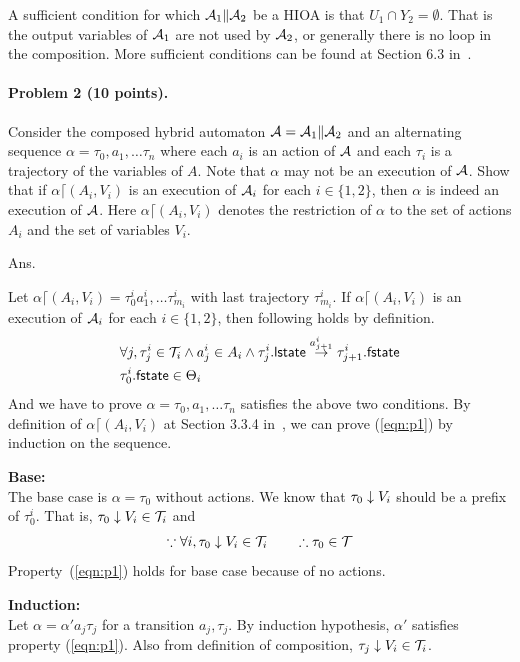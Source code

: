 \documentclass[11pt]{article}
\begin{document}
A sufficient condition for which ${\cal A}_1 \| {\cal A}_2$ be a HIOA is that  $U_1 \cap Y_2 = \emptyset$.
That is the output variables of ${\cal A}_1$ are not used by ${\cal A}_2$,
or generally there is no loop in the composition.
More sufficient conditions can be found at Section 6.3 in~\cite{Lynch2003105}.

\newpage

\paragraph{Problem 2 (10 points).}
Consider the composed hybrid automaton ${\cal A} = {\cal A}_1 \| {\cal A}_2$ and 
an alternating sequence $\alpha = \tau_0, a_1, \ldots \tau_n$ where each $a_i$ is an action of ${\cal A}$ and each $\tau_i$ is a trajectory of the variables of $A$. 
Note that $\alpha$ may not be an execution of ${\cal A}$. 
Show that if $\alpha \lceil (A_i, V_i)$ is an execution of ${\cal A}_i$ for each $i \in \{1, 2\}$, 
then $\alpha$ is indeed an execution of ${\cal A}$.
%
Here $\alpha \lceil (A_i, V_i)$ denotes the restriction of $\alpha$ to the set of actions $A_i$ and the set of variables $V_i$.

Ans.

Let $\alpha \lceil (A_i, V_i) = \tau_0^i a_1^i, \ldots \tau_{m_i}^i$
with last trajectory $\tau_{m_i}^i$.
If $\alpha \lceil (A_i, V_i)$ is an execution of ${\cal A}_i$ for each $i \in \{1, 2\}$,
then following holds by definition.
\begin{align}
&\forall j, \tau_j^i \in {\cal T}_i \land a_j^i \in A_i \land \tau_j^i.{\sf lstate} \mathrel{\stackrel{a_{j+1}^i}{\rightarrow}} \tau_{j+1}^{i}.{\sf fstate} \label{eqn:p1}\\
&\tau_0^i.{\sf fstate} \in \Theta_i \label{eqn:p2}
\end{align}
And we have to prove $\alpha = \tau_0, a_1, \ldots \tau_n$ satisfies the above two conditions.
By definition of $\alpha \lceil (A_i, V_i)$ at Section 3.3.4 in~\cite{Lynch2003105},
we can prove (\ref{eqn:p1}) by induction on the sequence.

\textbf{Base:}\\
The base case is $\alpha = \tau_0$ without actions.
We know that $\tau_0 \mathrel{\downarrow} V_i$ should be a prefix of $\tau_0^i$.
That is, $\tau_0 \mathrel{\downarrow} V_i \in {\cal T}_i$ and
\[
\because \forall i, \tau_0 \mathrel{\downarrow} V_i \in {\cal T}_i \qquad \therefore \tau_0 \in {\cal T}
\]
Property~(\ref{eqn:p1}) holds for base case because of no actions.

\textbf{Induction:}\\
Let $\alpha = \alpha' a_j \tau_j$ for a transition $a_{j}, \tau_{j}$.
By induction hypothesis, $\alpha'$ satisfies property (\ref{eqn:p1}).
Also from definition of composition, $\tau_j\mathrel{\downarrow} V_i \in {\cal T}_i$.
\end{document}
